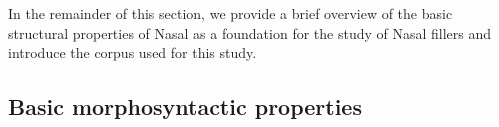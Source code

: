 \documentclass[output=paper,colorlinks,citecolor=brown
\ChapterDOI{10.5281/zenodo.15697585}
]{langscibook}
\begin{document}
In the remainder of this section, we provide a brief overview of the basic structural properties of Nasal as a foundation for the study of Nasal fillers and introduce the corpus used for this study.

\subsection{Basic morphosyntactic properties}\label{sec:BasicMorpho}

\end{document}
